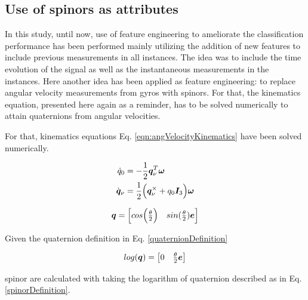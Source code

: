 \subsection{Use of spinors as attributes}
In this study, until now, use of feature engineering to ameliorate the classification performance has been performed mainly utilizing the addition of new features to include previous measurements in all instances. The idea was to include the time evolution of the signal as well as the instantaneous measurements in the instances. Here another idea has been applied as feature engineering: to replace angular velocity measurements from gyros with spinors. For that, the kinematics equation, presented here again as a reminder, has to be solved numerically to attain quaternions from angular velocities.

For that, kinematics equations Eq. \ref{eqn:angVelocityKinematics} have been solved numerically.

\begin{align}{\label{eqn:angVelocityKinematics}}
\begin{split}
 \dot{q}_0 &= -\frac{1}{2} \bm{q}_\nu^T \bm{\omega}\\
 \dot{\bm{q}}_\nu &= \frac{1}{2}\Big(\bm{q}_\nu^\times + q_0 \bm{I}_3 \Big) \bm{\omega} \\
\end{split}
\end{align}

\begin{equation}{\label{quaternionDefinition}}
\bm{q} = \begin{bmatrix} 
cos\Big(\frac{\theta}{2}\Big) & sin(\frac{\theta}{2}) \bm{e} \\
\end{bmatrix}
\end{equation}

Given the quaternion definition in  Eq. \ref{quaternionDefinition} 

\begin{equation}{\label{spinorDefinition}}
log(\bm{q}) = \begin{bmatrix} 
0 & \frac{\theta}{2} \bm{e} \\
\end{bmatrix}
\end{equation}

spinor are calculated with taking the logarithm of quaternion described as in Eq. \ref{spinorDefinition}.

